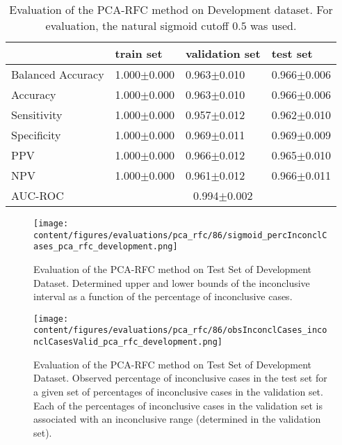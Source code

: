 

\begin{table}[ht]
  \caption{Evaluation of the PCA-RFC method on Development dataset. 
  For evaluation, the natural sigmoid cutoff $0.5$ was used.}
  \centering
  \begin{tabular}{llll}
      \hline
                        & train set         & validation set      & test set             \\
      \hline
      Balanced Accuracy & 1.000$\pm$0.000   &   0.963$\pm$0.010    &  0.966$\pm$0.006   \\
      Accuracy          & 1.000$\pm$0.000    &   0.963$\pm$0.010  &  0.966$\pm$0.006    \\
      Sensitivity       &  1.000$\pm$0.000   &   0.957$\pm$0.012   &  0.962$\pm$0.010   \\
      Specificity       & 1.000$\pm$0.000    &   0.969$\pm$0.011  &  0.969$\pm$0.009   \\
      PPV               &  1.000$\pm$0.000   &   0.966$\pm$0.012   &  0.965$\pm$0.010   \\
      NPV               &  1.000$\pm$0.000   &   0.961$\pm$0.012  &  0.966$\pm$0.011   \\
      \hline
      AUC-ROC          &  \multicolumn{3}{c}{0.994$\pm$0.002}  \\
      \hline
  \end{tabular}
 \label{t1:erc_perf_eval_table}
\end{table}

\begin{figure}[t]
  \centering
  \texttt{[image: content/figures/evaluations/pca\_rfc/86/sigmoid\_percInconclCases\_pca\_rfc\_development.png]}
  \caption{Evaluation of the PCA-RFC method on Test Set of Development Dataset. 
  Determined upper and lower bounds of the inconclusive interval as a function of the percentage of inconclusive cases.} 
  \label{fig:pca_rfc_percInconclCases_development}
\end{figure}


\begin{figure}[h]
  \centering
  \texttt{[image: content/figures/evaluations/pca\_rfc/86/obsInconclCases\_inconclCasesValid\_pca\_rfc\_development.png]}
  \caption{Evaluation of the PCA-RFC method on Test Set of Development Dataset.
  Observed percentage of inconclusive cases in the test set 
  for a given set of percentages of inconclusive cases in the validation set.
  Each of the percentages of inconclusive cases in the validation set is associated 
  with an inconclusive range (determined in the validation set).} 
  \label{fig:obsInconclCases_inconclCasesValid_pca_rfc_development}
\end{figure} 


